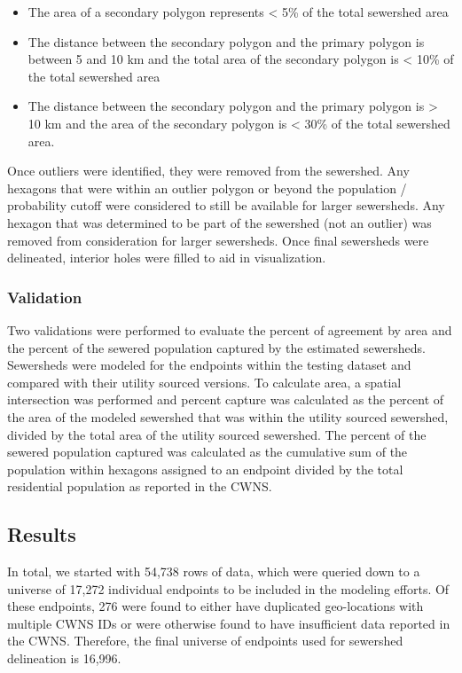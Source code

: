 \documentclass[
  letterpaper,
  DIV=11,
  numbers=noendperiod]{scrartcl}
\providecommand{\tightlist}{%
  \setlength{\itemsep}{0pt}\setlength{\parskip}{0pt}}\usepackage{longtable,booktabs,array}
\begin{document}
\begin{itemize}
\tightlist
\item
  The area of a secondary polygon represents \textless{} 5\% of the
  total sewershed area
\item
  The distance between the secondary polygon and the primary polygon is
  between 5 and 10 km and the total area of the secondary polygon is
  \textless{} 10\% of the total sewershed area
\item
  The distance between the secondary polygon and the primary polygon is
  \textgreater{} 10 km and the area of the secondary polygon is
  \textless{} 30\% of the total sewershed area.
\end{itemize}

Once outliers were identified, they were removed from the sewershed. Any
hexagons that were within an outlier polygon or beyond the population /
probability cutoff were considered to still be available for larger
sewersheds. Any hexagon that was determined to be part of the sewershed
(not an outlier) was removed from consideration for larger sewersheds.
Once final sewersheds were delineated, interior holes were filled to aid
in visualization.

\subsubsection{Validation}\label{validation}

Two validations were performed to evaluate the percent of agreement by
area and the percent of the sewered population captured by the estimated
sewersheds. Sewersheds were modeled for the endpoints within the testing
dataset and compared with their utility sourced versions. To calculate
area, a spatial intersection was performed and percent capture was
calculated as the percent of the area of the modeled sewershed that was
within the utility sourced sewershed, divided by the total area of the
utility sourced sewershed. The percent of the sewered population
captured was calculated as the cumulative sum of the population within
hexagons assigned to an endpoint divided by the total residential
population as reported in the CWNS.

\subsection{Results}\label{results}

In total, we started with 54,738 rows of data, which were queried down
to a universe of 17,272 individual endpoints to be included in the
modeling efforts. Of these endpoints, 276 were found to either have
duplicated geo-locations with multiple CWNS IDs or were otherwise found
to have insufficient data reported in the CWNS. Therefore, the final
universe of endpoints used for sewershed delineation is 16,996.
\end{document}
